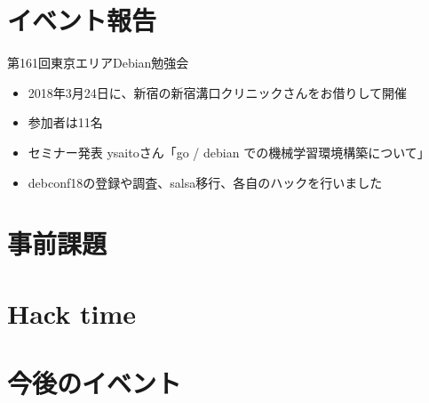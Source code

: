 \section{イベント報告}

\begin{frame}{第161回東京エリアDebian勉強会}
\begin{itemize}
\item 2018年3月24日に、新宿の新宿溝口クリニックさんをお借りして開催
\item 参加者は11名
\item セミナー発表 ysaitoさん「go / debian での機械学習環境構築について」
\item debconf18の登録や調査、salsa移行、各自のハックを行いました
\end{itemize} 
\end{frame}


\section{事前課題}
{\footnotesize
 
}

%


\section{Hack time}

  
\section{今後のイベント}

